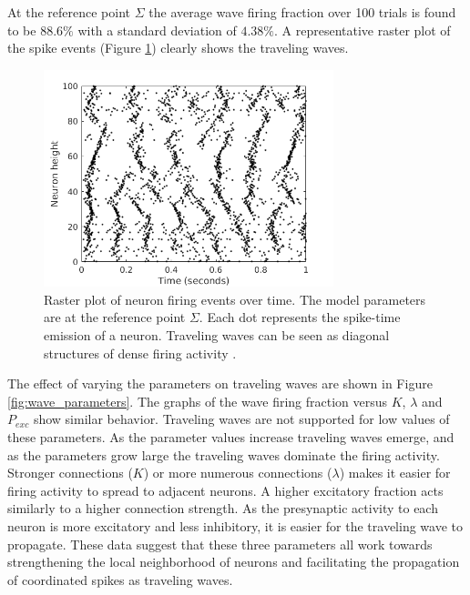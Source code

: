 \documentclass[12pt]{article}
\begin{document}
At the \color{red}reference \color{black} point $\Sigma$ the average wave firing fraction over 100 trials is found to be $88.6\%$ with a standard deviation of $4.38\%$.
A representative raster plot of the spike events (Figure \ref{fig:sigma_raster}) clearly shows the traveling waves.
\begin{figure}[!htb]
 \centering
 \includegraphics[width=0.75\textwidth]{fig/baseline}
 \caption{Raster plot of neuron firing events over time. The model parameters are at the \color{red}reference \color{black} point $\Sigma$. Each dot represents the spike-time emission of a neuron. Traveling waves can be seen as diagonal structures of dense firing activity \parencite{Senk2020}. }
 \label{fig:sigma_raster}
\end{figure}

The effect of varying the parameters on traveling waves are shown in Figure \ref{fig:wave_parameters}.
The graphs of the wave firing fraction versus $K$, $\lambda$ and $P_{exc}$ show similar behavior.
Traveling waves are not supported for low values of these parameters.
As the parameter values increase traveling waves emerge, and as the parameters grow large the traveling waves dominate the firing activity.
Stronger connections ($K$) or more numerous connections ($\lambda$) makes it easier for firing activity to spread to adjacent neurons.
A higher excitatory fraction acts similarly to a higher connection strength. 
As the presynaptic activity to each neuron is more excitatory and less inhibitory, it is easier for the traveling wave to propagate.
These data suggest that these three parameters all work towards strengthening the local neighborhood of neurons and facilitating the propagation of coordinated spikes as traveling waves.
\end{document}
